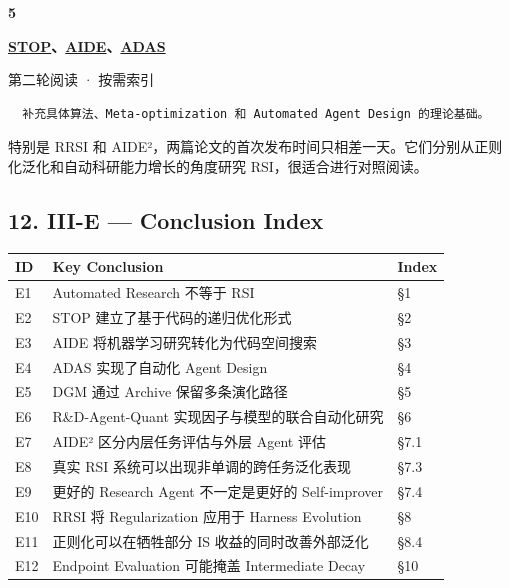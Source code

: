 \textbf{5}

\textbf{\href{https://arxiv.org/abs/2310.02304}{STOP}、\href{https://arxiv.org/abs/2502.13138}{AIDE}、\href{https://arxiv.org/abs/2408.08435}{ADAS}}

第二轮阅读 · 按需索引

\begin{verbatim}
  补充具体算法、Meta-optimization 和 Automated Agent Design 的理论基础。
\end{verbatim}

特别是 RRSI 和 AIDE²，两篇论文的首次发布时间只相差一天。它们分别从正则化泛化和自动科研能力增长的角度研究 RSI，很适合进行对照阅读。

\hypertarget{part-3-44-0001-iii-e-conclusion-index}{%
\subsection{12. III-E --- Conclusion Index}\label{part-3-44-0001-iii-e-conclusion-index}}

\begin{readertable}
\begin{longtable}[]{@{}
  >{\raggedright\arraybackslash}p{}
  >{\raggedright\arraybackslash}p{}
  >{\raggedright\arraybackslash}p{}@{}}
\toprule
ID & Key Conclusion & Index \\
\midrule
\endhead
E1 & Automated Research 不等于 RSI & §1 \\
E2 & STOP 建立了基于代码的递归优化形式 & §2 \\
E3 & AIDE 将机器学习研究转化为代码空间搜索 & §3 \\
E4 & ADAS 实现了自动化 Agent Design & §4 \\
E5 & DGM 通过 Archive 保留多条演化路径 & §5 \\
E6 & R\&D-Agent-Quant 实现因子与模型的联合自动化研究 & §6 \\
E7 & AIDE² 区分内层任务评估与外层 Agent 评估 & §7.1 \\
E8 & 真实 RSI 系统可以出现非单调的跨任务泛化表现 & §7.3 \\
E9 & 更好的 Research Agent 不一定是更好的 Self-improver & §7.4 \\
E10 & RRSI 将 Regularization 应用于 Harness Evolution & §8 \\
E11 & 正则化可以在牺牲部分 IS 收益的同时改善外部泛化 & §8.4 \\
E12 & Endpoint Evaluation 可能掩盖 Intermediate Decay & §10 \\
\bottomrule
\end{longtable}
\end{readertable}

